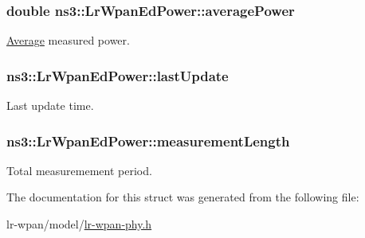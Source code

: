 \subsubsection[{\texorpdfstring{average\+Power}{averagePower}}]{\setlength{\rightskip}{0pt plus 5cm}double ns3\+::\+Lr\+Wpan\+Ed\+Power\+::average\+Power}\hypertarget{structns3_1_1LrWpanEdPower_a1c454915534c342f9706e6e42006b388}{}\label{structns3_1_1LrWpanEdPower_a1c454915534c342f9706e6e42006b388}


\hyperlink{classns3_1_1Average}{Average} measured power. 

\subsubsection[{\texorpdfstring{last\+Update}{lastUpdate}}]{ ns3\+::\+Lr\+Wpan\+Ed\+Power\+::last\+Update}\hypertarget{structns3_1_1LrWpanEdPower_ac652b200f53980a1632776b9ee2c8456}{}\label{structns3_1_1LrWpanEdPower_ac652b200f53980a1632776b9ee2c8456}


Last update time. 

\subsubsection[{\texorpdfstring{measurement\+Length}{measurementLength}}]{ ns3\+::\+Lr\+Wpan\+Ed\+Power\+::measurement\+Length}\hypertarget{structns3_1_1LrWpanEdPower_ad0843da1bc59c22ff31bbd2023f61dc0}{}\label{structns3_1_1LrWpanEdPower_ad0843da1bc59c22ff31bbd2023f61dc0}


Total measuremement period. 



The documentation for this struct was generated from the following file\+:\begin{DoxyCompactItemize}
\item 
lr-\/wpan/model/\hyperlink{lr-wpan-phy_8h}{lr-\/wpan-\/phy.\+h}\end{DoxyCompactItemize}
